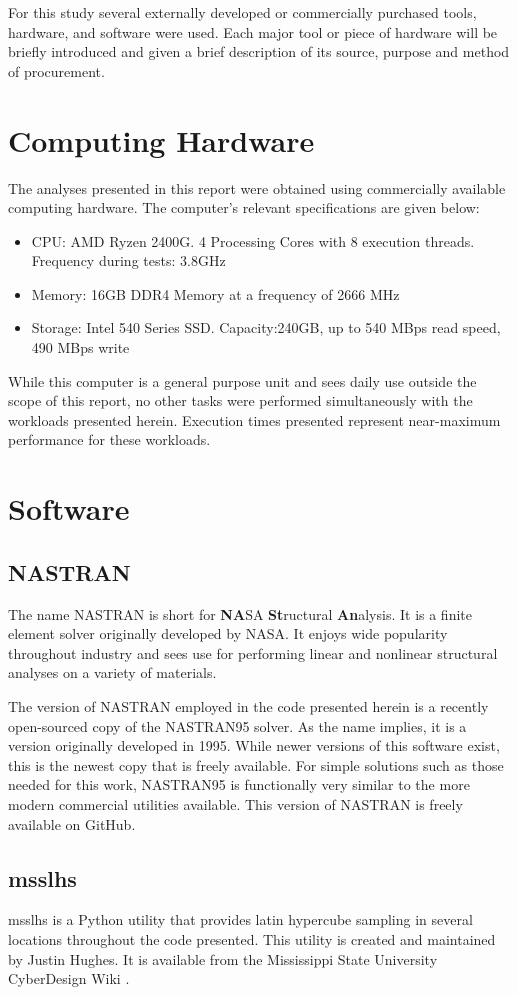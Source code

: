 For this study several externally developed or commercially purchased tools, hardware, and software were used. Each major tool or piece of hardware will be briefly introduced and given a brief description of its source, purpose and method of procurement.

\section{Computing Hardware}
The analyses presented in this report were obtained using commercially available computing hardware. The computer's relevant specifications are given below: 

\begin{itemize}
\item CPU: AMD Ryzen 2400G. 4 Processing Cores with 8 execution threads. Frequency during tests: 3.8GHz
\item Memory: 16GB DDR4 Memory at a frequency of 2666 MHz
\item Storage: Intel 540 Series SSD. Capacity:240GB, up to 540 MBps read speed, 490 MBps write
\end{itemize}

While this computer is a general purpose unit and sees daily use outside the scope of this report, no other tasks were performed simultaneously with the workloads presented herein. Execution times presented represent near-maximum performance for these workloads. 

\section{Software}
\subsection{NASTRAN}
The name NASTRAN is short for \textbf{NA}SA \textbf{St}ructural \textbf{An}alysis. It is a finite element solver originally developed by NASA. It enjoys wide popularity throughout industry and sees use for performing linear and nonlinear structural analyses on a variety of materials\cite{nasa-tech}. 

The version of NASTRAN employed in the code presented herein is a recently open-sourced copy of the NASTRAN95 solver. As the name implies, it is a version originally developed in 1995. While newer versions of this software exist, this is the newest copy that is freely available. For simple solutions such as those needed for this work, NASTRAN95 is functionally very similar to the more modern commercial utilities available. This version of NASTRAN is freely available on GitHub\cite{nasa-git}. 

\subsection{msslhs}

msslhs is a Python utility that provides latin hypercube sampling in several locations throughout the code presented. This utility is created and maintained by Justin Hughes. It is available from the Mississippi State University CyberDesign Wiki \cite{msslhs}. 
